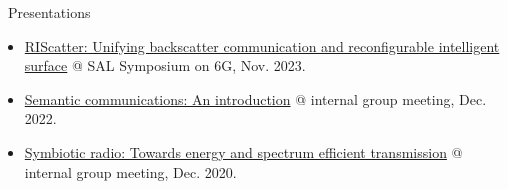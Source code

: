 \documentclass{cv}
\begin{document}
\begin{section}{\faComment\ Presentations}
	\begin{itemize}
		\item \href{https://github.com/snowztail/riscatter-unifying-backscatter-communication-and-reconfigurable-intelligent-surface/blob/master/poster/beamer.pdf}{RIScatter: Unifying backscatter communication and reconfigurable intelligent surface} @ SAL Symposium on 6G, Nov. 2023.
		\item \href{https://github.com/snowztail/presentations/blob/master/semantic-communications-an-introduction/slides.pdf}{Semantic communications: An introduction} @ internal group meeting, Dec. 2022.
		\item \href{https://github.com/snowztail/presentations/blob/master/symbiotic-radio-towards-energy-and-spectrum-efficient-transmission/main.pdf}{Symbiotic radio: Towards energy and spectrum efficient transmission} @ internal group meeting, Dec. 2020.
	\end{itemize}
\end{section}

\vspace{-1em}
\end{document}
